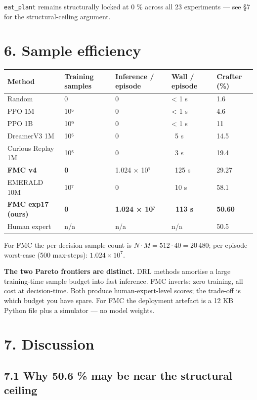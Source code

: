 \texttt{eat\_plant} remains structurally locked at 0 \% across all 23
experiments — see §7 for the structural-ceiling argument.

\hrulefill

\section{6. Sample efficiency}

\begin{tabular}{l l l l l}
\toprule
Method & Training samples & Inference / episode & Wall / episode & Crafter (\%) \\
\midrule
Random & 0 & 0 & < 1 s & 1.6 \\
PPO 1M & 10⁶ & 0 & < 1 s & 4.6 \\
PPO 1B & 10⁹ & 0 & < 1 s & 11 \\
DreamerV3 1M & 10⁶ & 0 & ~5 s & 14.5 \\
Curious Replay 1M & 10⁶ & 0 & ~3 s & 19.4 \\
\textbf{FMC v4} & \textbf{0} & 1.024 × 10⁷ & ~125 s & 29.27 \\
EMERALD 10M & 10⁷ & 0 & ~10 s & 58.1 \\
\textbf{FMC exp17 (ours)} & \textbf{0} & \textbf{1.024 × 10⁷} & \textbf{~113 s} & \textbf{50.60} \\
Human expert & n/a & n/a & n/a & 50.5 \\
\bottomrule
\end{tabular}

For FMC the per-decision sample count is $N \cdot M = 512 \cdot 40 =
20\,480$; per episode worst-case (500 max-steps): $1.024 \times 10^7$.

\textbf{The two Pareto frontiers are distinct.} DRL methods amortise a
large training-time sample budget into fast inference. FMC inverts:
zero training, all cost at decision-time. Both produce
human-expert-level scores; the trade-off is which budget you have
spare. For FMC the deployment artefact is a 12 KB Python file plus
a simulator — no model weights.

\hrulefill

\section{7. Discussion}

\subsection{7.1 Why 50.6 \% may be near the structural ceiling}

